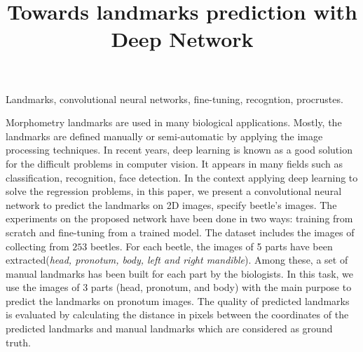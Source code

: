 \documentclass[10pt]{article}
\begin{document}
\noindent



\title{Towards landmarks prediction with Deep Network}




\maketitle

\keywords
Landmarks, convolutional neural networks, fine-tuning, recogntion, procrustes.

\abstract
Morphometry landmarks are used in many biological
applications. Mostly, the landmarks are defined manually or
semi-automatic by applying the image processing techniques. In recent
years, deep learning is known as a good solution for the difficult
problems in computer vision. It appears in many fields such as
classification, recognition, face detection. In the context applying
deep learning to solve the regression problems, in this paper, we
present a convolutional neural network to predict the landmarks on 2D
images, specify beetle's images. The experiments on the
proposed network have been done in two ways: training from scratch and
fine-tuning from a trained model. The dataset includes the images of 
collecting from $253$ beetles. For each beetle, the images of 5 parts 
have been extracted(\textit{head, pronotum, body, left and right mandible}).
 Among these, a set of manual landmarks has been built for each part by 
the biologists. In this task, we use the images of 3 parts (head, pronotum, and body) with the main purpose to predict the landmarks on pronotum images.
 The quality of predicted landmarks
is evaluated by calculating the distance in pixels between the
coordinates of the predicted landmarks and manual landmarks which are
considered as ground truth.
\end{document}
